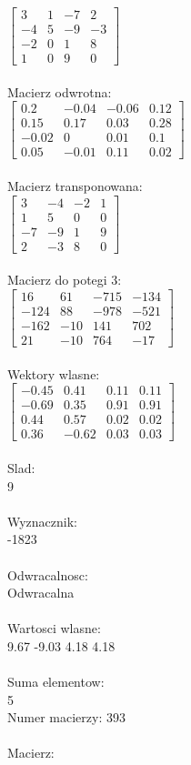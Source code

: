 \documentclass[a4paper,12pt]{article}
\begin{document}
$\begin{bmatrix} 3&1&-7&2\\-4&5&-9&-3\\-2&0&1&8\\1&0&9&0 \end{bmatrix}$
\\
\\
Macierz odwrotna:\\

$\begin{bmatrix} 0.2&-0.04&-0.06&0.12\\0.15&0.17&0.03&0.28\\-0.02&0&0.01&0.1\\0.05&-0.01&0.11&0.02 \end{bmatrix}$
\\
\\
Macierz transponowana:\\

$\begin{bmatrix} 3&-4&-2&1\\1&5&0&0\\-7&-9&1&9\\2&-3&8&0 \end{bmatrix}$
\\
\\
Macierz do potegi 3:\\

$\begin{bmatrix} 16&61&-715&-134\\-124&88&-978&-521\\-162&-10&141&702\\21&-10&764&-17 \end{bmatrix}$
\\
\\
Wektory wlasne:\\

$\begin{bmatrix} -0.45&0.41&0.11&0.11\\-0.69&0.35&0.91&0.91\\0.44&0.57&0.02&0.02\\0.36&-0.62&0.03&0.03 \end{bmatrix}$
\\
\\
Slad:\\
9
\\
\\
Wyznacznik:\\
-1823
\\
\\
Odwracalnosc:\\
Odwracalna
\\
\\
Wartosci wlasne:\\
9.67 -9.03 4.18 4.18
\\
\\
Suma elementow:\\
5
\\
\newpage
Numer macierzy:
393
\\
\\
Macierz:\\
\end{document}
